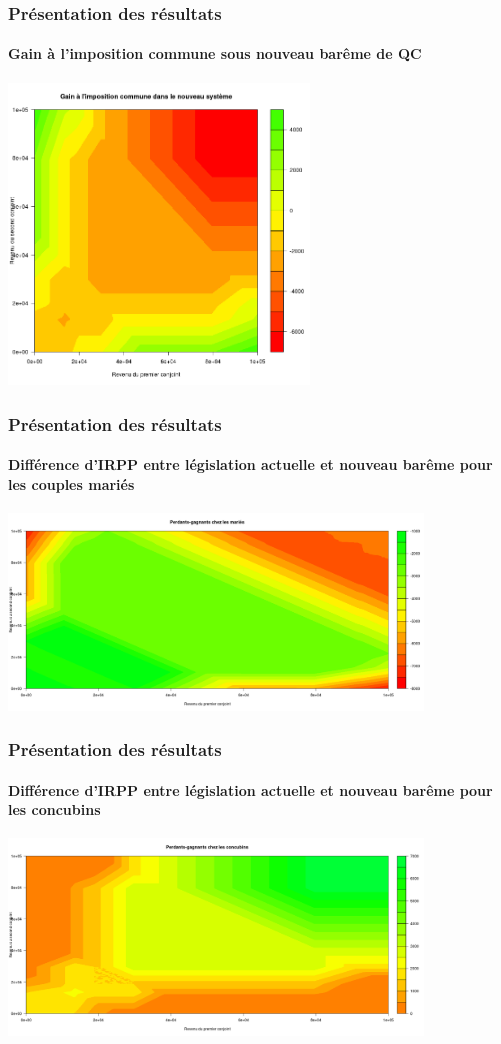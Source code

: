 \documentclass{beamer}
\begin{document}
\begin{frame}
\frametitle{Présentation des résultats}
\framesubtitle{Gain à l'imposition commune sous nouveau barême de QC}
\includegraphics[width=8cm]{GainImpComm2.png}
\end{frame}

\begin{frame}
\frametitle{Présentation des résultats}
\framesubtitle{Différence d'IRPP entre législation actuelle et nouveau barême pour les couples mariés}
\includegraphics[width=11cm]{perdantsmar.png}
\end{frame}

\begin{frame}
\frametitle{Présentation des résultats}
\framesubtitle{Différence d'IRPP entre législation actuelle et nouveau barême pour les concubins}
\includegraphics[width=11cm]{perdantsconc.png}
\end{frame}
\end{document}

